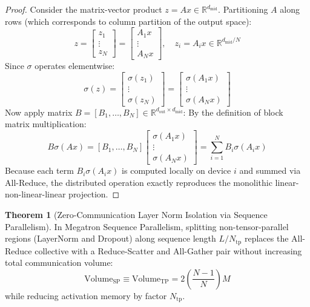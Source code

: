 \documentclass[11pt,a4paper]{article}
\theoremstyle{definition}
\newtheorem{theorem}{\textbf{Theorem}}[section]
\begin{document}
\begin{proof}
Consider the matrix-vector product $z = A x \in \mathbb{R}^{d_{\text{mid}}}$.
Partitioning $A$ along rows (which corresponds to column partition of the output space):
{\boldmath
\begin{equation}
z = \begin{bmatrix} z_1 \\ \vdots \\ z_N \end{bmatrix} = \begin{bmatrix} A_1 x \\ \vdots \\ A_N x \end{bmatrix}, \quad z_i = A_i x \in \mathbb{R}^{d_{\text{mid}} / N}
\end{equation}
}
Since $\sigma$ operates elementwise:
{\boldmath
\begin{equation}
\sigma(z) = \begin{bmatrix} \sigma(z_1) \\ \vdots \\ \sigma(z_N) \end{bmatrix} = \begin{bmatrix} \sigma(A_1 x) \\ \vdots \\ \sigma(A_N x) \end{bmatrix}
\end{equation}
}
Now apply matrix $B = [B_1, \dots, B_N] \in \mathbb{R}^{d_{\text{out}} \times d_{\text{mid}}}$:
By the definition of block matrix multiplication:
{\boldmath
\begin{equation}
B \sigma(A x) = [B_1, \dots, B_N] \begin{bmatrix} \sigma(A_1 x) \\ \vdots \\ \sigma(A_N x) \end{bmatrix} = \sum_{i=1}^N B_i \sigma(A_i x)
\end{equation}
}
Because each term $B_i \sigma(A_i x)$ is computed locally on device $i$ and summed via All-Reduce, the distributed operation exactly reproduces the monolithic linear-non-linear-linear projection.
\end{proof}

\begin{theorem}[Zero-Communication Layer Norm Isolation via Sequence Parallelism]
In Megatron Sequence Parallelism, splitting non-tensor-parallel regions (LayerNorm and Dropout) along sequence length $L / N_{\text{tp}}$ replaces the All-Reduce collective with a Reduce-Scatter and All-Gather pair without increasing total communication volume:
{\boldmath
\begin{equation}
\text{Volume}_{\text{SP}} \equiv \text{Volume}_{\text{TP}} = 2 \left( \frac{N - 1}{N} \right) M
\end{equation}
}
while reducing activation memory by factor $N_{\text{tp}}$.
\end{theorem}
\end{document}
